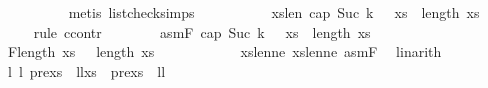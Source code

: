 \begin{isabellebody}
\ \ \ \ \ \ \ \ \isamarkupfalse%
\ {\isacharparenleft}{\kern0pt}metis\ list{\isacharunderscore}{\kern0pt}check{\isachardot}{\kern0pt}simps{\isacharparenleft}{\kern0pt}{}{\isacharparenright}{\kern0pt}{\isacharparenright}{\kern0pt}\isanewline
\ \ \ \ \isamarkupfalse%
\isanewline
\isanewline
\ \ \ \ \isamarkupfalse%
\ xs{}{\isacharunderscore}{\kern0pt}len{}{\isacharcolon}{\kern0pt}\ {\isachardoublequoteopen}cap\ {\isacharparenleft}{\kern0pt}Suc\ {\isacharparenleft}{\kern0pt}k\ {\isacharplus}{\kern0pt}\ {}{\isacharparenright}{\kern0pt}{\isacharparenright}{\kern0pt}\ xs\ {\isasymLongrightarrow}\ length\ xs{}\ {\isacharequal}{\kern0pt}\ {}{\isachardoublequoteclose}\isanewline
\ \ \ \ \isamarkupfalse%
{\isacharparenleft}{\kern0pt}rule\ ccontr{\isacharparenright}{\kern0pt}\isanewline
\ \ \ \ \ \ \isamarkupfalse%
\ asmF{\isacharcolon}{\kern0pt}\ {\isachardoublequoteopen}cap\ {\isacharparenleft}{\kern0pt}Suc\ {\isacharparenleft}{\kern0pt}k\ {\isacharplus}{\kern0pt}\ {}{\isacharparenright}{\kern0pt}{\isacharparenright}{\kern0pt}\ xs{\isachardoublequoteclose}\ {\isachardoublequoteopen}{\isasymnot}\ length\ xs{}\ {\isacharequal}{\kern0pt}\ {}{\isachardoublequoteclose}\isanewline
\ \ \ \ \ \ \isamarkupfalse%
\ F{}{\isacharcolon}{\kern0pt}{\isachardoublequoteopen}length\ xs{}\ {\isasymge}\ {}{\isachardoublequoteclose}\ {\isachardoublequoteopen}length\ xs{}\ {\isasymge}\ {}{\isachardoublequoteclose}\isanewline
\ \ \ \ \ \ \ \ \isamarkupfalse%
\ xs{}{\isacharunderscore}{\kern0pt}len{\isacharunderscore}{\kern0pt}ne{\isacharunderscore}{\kern0pt}{}\ xs{}{\isacharunderscore}{\kern0pt}len{\isacharunderscore}{\kern0pt}ne{\isacharunderscore}{\kern0pt}{}\ asmF{\isacharparenleft}{\kern0pt}{}{\isacharparenright}{\kern0pt}\ \isamarkupfalse%
\ linarith{\isacharplus}{\kern0pt}\isanewline
\isanewline
\ \ \ \ \ \ \isamarkupfalse%
\ \isamarkupfalse%
\ l{}\ l{}\ prexs{}\ \ l{}l{}{\isacharcolon}{\kern0pt}{\isachardoublequoteopen}xs{}\ {\isacharequal}{\kern0pt}\ prexs{}\ {\isacharat}{\kern0pt}\ {\isacharbrackleft}{\kern0pt}l{}{\isacharcomma}{\kern0pt}l{}{\isacharbrackright}{\kern0pt}{\isachardoublequoteclose}\isanewline

\end{isabellebody}
